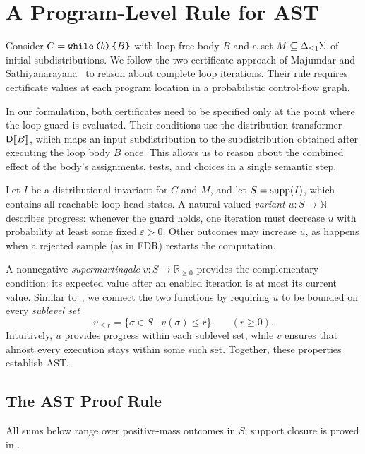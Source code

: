 \section{A Program-Level Rule for AST}
\label{sec:rule}

Consider $C=\textnormal{\texttt{while}}\,\textnormal{\texttt{(}} b\textnormal{\texttt{)}}\,\textnormal{\texttt{\{}} B\textnormal{\texttt{\}}}$ with loop-free body $B$ and a set
$M\subseteq{\Delta_{\leq 1}\Sigma}$ of initial subdistributions.
We follow the two-certificate approach of Majumdar and
Sathiyanarayana~\cite{DBLP:journals/pacmpl/MajumdarS25}
to reason about complete loop iterations.
Their rule requires certificate values at each program location
in a probabilistic control-flow graph.

In our formulation, both certificates need to be specified
only at the point where the loop guard is evaluated.
Their conditions use the distribution transformer $\mathsf{D}\llbracket B\rrbracket$,
which maps an input subdistribution to the subdistribution
obtained after executing the loop body $B$ once.
This allows us to reason about the combined effect of the
body's assignments, tests, and choices in a single semantic step.

Let $I$ be a distributional invariant for $C$ and $M$, and let
$S=\textnormal{supp}(I)$, which contains all reachable loop-head states.
A natural-valued \emph{variant} $u:S\to\mathbb N$ describes progress:
whenever the guard holds, one iteration must decrease $u$ with probability
at least some fixed $\varepsilon>0$. Other outcomes may increase $u$,
as happens when a rejected sample (as in FDR) restarts the computation.

A nonnegative \emph{supermartingale} $v:S\to\mathbb R_{\geq0}$
provides the complementary condition: its expected value after an
enabled iteration is at most its current value. Similar to~\cite{DBLP:journals/pacmpl/MajumdarS25}, we connect the two
functions by requiring $u$ to be bounded on every \emph{sublevel set}
\[
 v_{\leq r}=\{\sigma\in S\mid v(\sigma)\leq r\}
 \qquad(r\geq0).
\]
Intuitively, $u$ provides progress within each sublevel set, while $v$
ensures that almost every execution stays within some such set.
Together, these properties establish AST.

\subsection{The AST Proof Rule}

All sums below range over positive-mass outcomes in $S$; support closure
is proved in .

